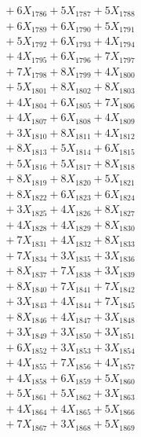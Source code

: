 \documentclass[a4paper,10pt]{article}
\begin{document}
{\begin{align}
&\;  + 6 X_{1786} + 5 X_{1787} + 5 X_{1788} \\[0.3ex]
&\;  + 6 X_{1789} + 6 X_{1790} + 5 X_{1791} \\[0.3ex]
&\;  + 5 X_{1792} + 6 X_{1793} + 4 X_{1794} \\[0.3ex]
&\;  + 4 X_{1795} + 6 X_{1796} + 7 X_{1797} \\[0.3ex]
&\;  + 7 X_{1798} + 8 X_{1799} + 4 X_{1800} \\[0.3ex]
&\;  + 5 X_{1801} + 8 X_{1802} + 8 X_{1803} \\[0.3ex]
&\;  + 4 X_{1804} + 6 X_{1805} + 7 X_{1806} \\[0.3ex]
&\;  + 4 X_{1807} + 6 X_{1808} + 4 X_{1809} \\[0.5ex]\allowbreak
&\;  + 3 X_{1810} + 8 X_{1811} + 4 X_{1812} \\[0.3ex]
&\;  + 8 X_{1813} + 5 X_{1814} + 6 X_{1815} \\[0.3ex]
&\;  + 5 X_{1816} + 5 X_{1817} + 8 X_{1818} \\[0.3ex]
&\;  + 8 X_{1819} + 8 X_{1820} + 5 X_{1821} \\[0.3ex]
&\;  + 8 X_{1822} + 6 X_{1823} + 6 X_{1824} \\[0.3ex]
&\;  + 3 X_{1825} + 4 X_{1826} + 8 X_{1827} \\[0.3ex]
&\;  + 4 X_{1828} + 4 X_{1829} + 8 X_{1830} \\[0.3ex]
&\;  + 7 X_{1831} + 4 X_{1832} + 8 X_{1833} \\[0.3ex]
&\;  + 7 X_{1834} + 3 X_{1835} + 3 X_{1836} \\[0.3ex]
&\;  + 8 X_{1837} + 7 X_{1838} + 3 X_{1839} \\[0.5ex]\allowbreak
&\;  + 8 X_{1840} + 7 X_{1841} + 7 X_{1842} \\[0.3ex]
&\;  + 3 X_{1843} + 4 X_{1844} + 7 X_{1845} \\[0.3ex]
&\;  + 8 X_{1846} + 4 X_{1847} + 3 X_{1848} \\[0.3ex]
&\;  + 3 X_{1849} + 3 X_{1850} + 3 X_{1851} \\[0.3ex]
&\;  + 6 X_{1852} + 3 X_{1853} + 3 X_{1854} \\[0.3ex]
&\;  + 4 X_{1855} + 7 X_{1856} + 4 X_{1857} \\[0.3ex]
&\;  + 4 X_{1858} + 6 X_{1859} + 5 X_{1860} \\[0.3ex]
&\;  + 5 X_{1861} + 5 X_{1862} + 3 X_{1863} \\[0.3ex]
&\;  + 4 X_{1864} + 4 X_{1865} + 5 X_{1866} \\[0.3ex]
&\;  + 7 X_{1867} + 3 X_{1868} + 5 X_{1869} \\[0.5ex]\allowbreak

\end{align}}
\end{document}
